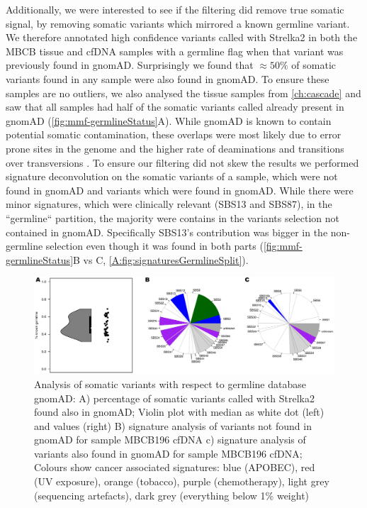 Additionally, we were interested to see if the filtering did remove true somatic signal, by removing somatic variants which mirrored a known germline variant. We therefore annotated high confidence variants called with Strelka2 in both the MBCB tissue and cfDNA samples with a germline flag when that variant was previously found in gnomAD. Surprisingly we found that $\approx 50\%$ of somatic variants found in any sample were also found in gnomAD. To ensure these samples are no outliers, we also analysed the tissue samples from \autoref{ch:cascade} and saw that all samples had half of the somatic variants called already present in gnomAD (\autoref{fig:mmf-germlineStatus}A). While gnomAD is known to contain potential somatic contamination, these overlaps were most likely due to error prone sites in the genome and the higher rate of deaminations and transitions over transversions \cite{Meyerson2020}. To ensure our filtering did not skew the results we performed signature deconvolution on the somatic variants of a sample, which were not found in gnomAD and variants which were found in gnomAD. While there were minor signatures, which were clinically relevant (SBS13 and SBS87), in the ``germline`` partition, the majority were contains in the variants selection not contained in gnomAD. Specifically SBS13's contribution was bigger in the non-germline selection even though it was found in both parts (\autoref{fig:mmf-germlineStatus}B vs C, \autoref{A:fig:signaturesGermlineSplit}).

\begin{figure}[ht]
\centering
\includegraphics[width=.99\linewidth]{Figures/MisMatchFinder/somaticVarsInGermlineSites.pdf}
\caption[Somatic variants found in germline sites]{Analysis of somatic variants with respect to germline database gnomAD: A) percentage of somatic variants called with Strelka2 found also in gnomAD; Violin plot with median as white dot (left) and values (right)  B) signature analysis of variants not found in gnomAD for sample MBCB196 cfDNA c) signature analysis of variants also found in gnomAD for sample MBCB196 cfDNA; Colours show cancer associated signatures: blue (APOBEC), red (UV exposure), orange (tobacco), purple (chemotherapy), light grey (sequencing artefacts), dark grey (everything below 1\% weight)}\label{fig:mmf-germlineStatus}
\end{figure}
  


